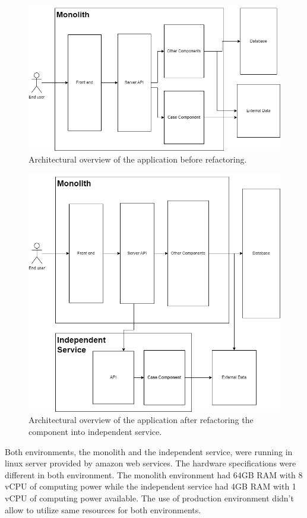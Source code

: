 \begin{figure}
    \includegraphics[width=\textwidth]{images/monolith_architecture.png}
    \caption{Architectural overview of the application before refactoring.}
    \label{figure:architecture:monolith}
\end{figure}
\begin{figure}
    \includegraphics[width=\textwidth]{images/independent_service_arcitecture.png}
    \caption{Architectural overview of the application after refactoring the component into independent service.}
    \label{figure:architecture:independent_service}
\end{figure}

Both environments, the monolith and the independent service, were running in linux server provided by amazon web services.
The hardware specifications were different in both environment.
The monolith environment had 64GB RAM with 8 vCPU of computing power while the independent service had 4GB RAM with 1 vCPU of computing power available.
The use of production environment didn't allow to utilize same resources for both environments.

